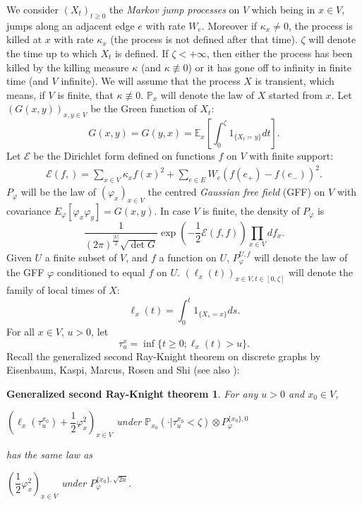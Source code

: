 \documentclass[11pt,a4paper]{amsart}
\numberwithin{equation}{section}
\newtheorem*{2ndRK}{Generalized second Ray-Knight theorem}
\begin{document}
We consider $(X_{t})_{t\ge0}$ the \textit{Markov jump processes} on $V$ which being in $x\in V$, jumps along an adjacent edge $e$ with rate $W_{e}$. Moreover if 
$\kappa_{x}\neq 0$, the process is killed at $x$ with rate $\kappa_{x}$ (the process is not defined after that time). $\zeta$ will denote the time up to which $X_{t}$ is defined. If $\zeta<+\infty$, then either the process has been killed by the killing measure $\kappa$ (and $\kappa \not\equiv 0$) or it has gone off to infinity in finite time 
(and $V$ infinite). We will assume that the process $X$ is transient, which means, if $V$ is finite, that 
$\kappa\not\equiv 0$. $\mathbb{P}_{x}$ will denote the law of $X$ started from $x$.
Let $(G(x,y))_{x,y\in V}$ be the Green function of $X_{t}$:
\begin{displaymath}
G(x,y)=G(y,x)=\mathbb{E}_{x}\left[\int_{0}^{\zeta} 1_{\{X_{t}=y\}} dt\right].
\end{displaymath}
Let $\mathcal{E}$ be the Dirichlet form defined on functions $f$ on $V$ with finite support:
\begin{eqnarray}\label{Dirichlet-form}
\mathcal{E}(f,)=\sum_{x\in V}\kappa_{x} f(x)^{2}+
\sum_{e\in E}W_e(f(e_{+})-f(e_{-}))^{2}.
\end{eqnarray}
$P_{\varphi}$ will be the law of $(\varphi_{x})_{x\in V}$ the centred 
\textit{Gaussian free field} (GFF) on $V$ with covariance
$E_{\varphi}[\varphi_{x}\varphi_{y}]=G(x,y)$. In case $V$ is finite, the density of $P_{\varphi}$ is
\begin{displaymath}
\dfrac{1}{(2\pi)^{\frac{\vert V\vert}{2}}\sqrt{\det G}}
\exp\left(-\dfrac{1}{2}\mathcal{E}(f,f)\right)\prod_{x\in V} df_{x}.
\end{displaymath}
Given $U$ a finite subset of $V$, and $f$ a function on $U$, $P^{U,f}_{\varphi}$ will denote the law of
the GFF $\varphi$ conditioned to equal $f$ on $U$.
$(\ell_{x}(t))_{x\in V, t\in [0,\zeta]}$ will denote the family of local times of $X$:
\begin{displaymath}
\ell_{x}(t)=\int_{0}^{t}1_{\{X_{s}=x\}} ds.
\end{displaymath}
For all $x\in V$, $u>0$, let
\begin{displaymath}
\tau_{u}^{x}=\inf\lbrace t\geq 0; \ell_{x}(t)>u\rbrace.
\end{displaymath}
Recall the generalized second Ray-Knight theorem on discrete graphs by Eisenbaum, Kaspi, Marcus, Rosen and Shi \cite{ekmrs} (see also 
\cite{MarcusRosen2006MarkovGaussianLocTime,Sznitman2012LectureIso}):
\begin{2ndRK}
For any $u>0$ and $x_{0}\in V$, 
\begin{center}
$\left(\ell_{x}(\tau_{u}^{x_{0}})+\dfrac{1}{2}\varphi_{x}^{2}\right)_{x\in V}$
under $\mathbb{P}_{x_{0}}(\cdot \vert \tau_{u}^{x_{0}}<\zeta)\otimes P^{\lbrace x_{0}\rbrace,0}_{\varphi}$
\end{center}
has the same law as 
\begin{center}
$\left(\dfrac{1}{2}\varphi_{x}^{2}\right)_{x\in V}$
under $P^{\lbrace x_{0}\rbrace,\sqrt{2u}}_{\varphi}$.
\end{center}
\end{2ndRK}
\end{document}
